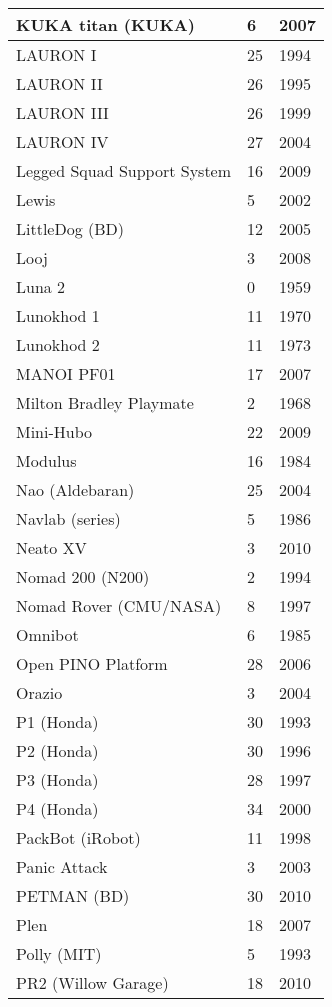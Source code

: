 \begin{longtable}{l | l | l }
KUKA titan (KUKA)	&	6	&	2007	\\	\hline
LAURON I	&	25	&	1994	\\	\hline
LAURON II	&	26	&	1995	\\	\hline
LAURON III	&	26	&	1999	\\	\hline
LAURON IV	&	27	&	2004	\\	\hline
Legged Squad Support System	&	16	&	2009	\\	\hline
Lewis	&	5	&	2002	\\	\hline
LittleDog (BD)	&	12	&	2005	\\	\hline
Looj	&	3	&	2008	\\	\hline
Luna 2	&	0	&	1959	\\	\hline
Lunokhod 1	&	11	&	1970	\\	\hline
Lunokhod 2	&	11	&	1973	\\	\hline
MANOI PF01	&	17	&	2007	\\	\hline
Milton Bradley Playmate	&	2	&	1968	\\	\hline
Mini-Hubo	&	22	&	2009	\\	\hline
Modulus	&	16	&	1984	\\	\hline
Nao (Aldebaran)	&	25	&	2004	\\	\hline
Navlab (series)	&	5	&	1986	\\	\hline
Neato XV	&	3	&	2010	\\	\hline
Nomad 200 (N200)	&	2	&	1994	\\	\hline
Nomad Rover (CMU/NASA)	&	8	&	1997	\\	\hline
Omnibot	&	6	&	1985	\\	\hline
Open PINO Platform	&	28	&	2006	\\	\hline
Orazio	&	3	&	2004	\\	\hline
P1 (Honda) \cite{robotsAsimo1041641}	&	30	&	1993	\\	\hline
P2 (Honda) \cite{robotsAsimo1041641}&	30	&	1996	\\	\hline
P3 (Honda) \cite{robotsAsimo1041641}	&	28	&	1997	\\	\hline
P4 (Honda) \cite{robotsAsimo1041641}	&	34	&	2000	\\	\hline
PackBot (iRobot)	&	11	&	1998	\\	\hline
Panic Attack	&	3	&	2003	\\	\hline
PETMAN (BD)	&	30	&	2010	\\	\hline
Plen	&	18	&	2007	\\	\hline
Polly (MIT)	&	5	&	1993	\\	\hline
PR2 (Willow Garage)	&	18	&	2010	\\	\hline

\end{longtable}
